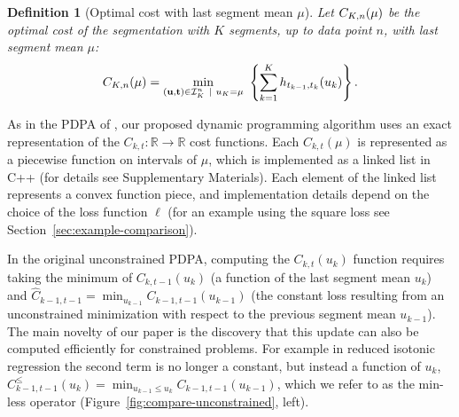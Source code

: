 \documentclass{article}
\newtheorem{definition}{Definition}
\newcommand{\RR}{\mathbb R}
\begin{document}


\begin{definition}[Optimal cost with last segment mean $\mu$]
\label{def:fcc}
  Let $C_{K,n}(\mu)$ be the optimal cost of the segmentation
  with $K$ segments, up to data point $n$, with last segment mean
  $\mu$:
\begin{equation}
C_{K,n}(\mu) = \min_{(\mathbf u, \mathbf t)\in{\mathcal I}^n_K \ | \ u_K = \mu} \
  \left\{ \sum_{k=1}^K
  h_{t_{k-1}, t_k}(u_k) \right\}.
\end{equation}
\end{definition}

As in the PDPA of \citet{pruned-dp}, our proposed dynamic programming
algorithm uses an exact representation of the
$C_{k,t}:\RR\rightarrow\RR$ cost functions. Each $C_{k,t}(\mu)$ is
represented as a piecewise function on intervals of $\mu$, which is
implemented as a linked list in C++ (for details see Supplementary
Materials). Each element of the linked list represents a convex
function piece, and implementation details depend on the choice of the
loss function $\ell$ (for an example using the square loss see
Section~\ref{sec:example-comparison}).

In the original unconstrained PDPA, computing the $C_{k,t}(u_k)$
function requires taking the minimum of $C_{k,t-1}(u_k)$ (a function
of the last segment mean $u_k$) and
$\hat C_{k-1,t-1} = \min_{u_{k-1}} C_{k-1,t-1}(u_{k-1})$ (the constant
loss resulting from an unconstrained minimization with respect to the
previous segment mean $u_{k-1}$). The main novelty of our paper is the
discovery that this update can also be computed efficiently for
constrained problems. For example in reduced isotonic regression the second
term is no longer a constant, but instead a function of $u_k$,
$C_{k-1,t-1}^{\leq}(u_k) = \min_{u_{k-1}\leq u_k}
C_{k-1,t-1}(u_{k-1})$, which we refer to as the min-less operator
(Figure~\ref{fig:compare-unconstrained}, left).
\end{document}

